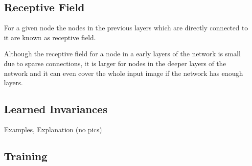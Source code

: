 \documentclass[]{article}
\begin{document}

\subsection{Receptive Field}
For a given node the nodes in the previous layers which are directly connected
to it are known as receptive field.

Although the receptive field for a node in a early layers of the network is small
due to sparse connections, it is larger for nodes in the deeper layers of the network
and it can even cover the whole input image if the network has enough layers.


\subsection{Learned Invariances}
Examples, Explanation (no pics)

\subsection{Training}



%
\end{document}
